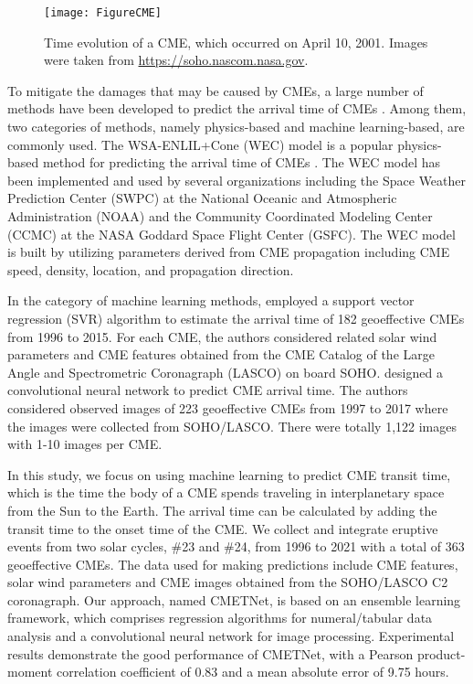 \documentclass{article}
\begin{document}
\begin{figure}
\begin{center}
\texttt{[image: FigureCME]}
\end{center}
\caption{Time evolution of a CME,
which occurred on April 10, 2001.
Images were taken from 
\url{https://soho.nascom.nasa.gov}.}
\label{fig:CME-images}
\end{figure}

To mitigate the damages that may be caused by CMEs, 
a large number of methods have been developed to
predict the arrival time of CMEs 
\citep{2014SpWea..12..448Z,2019SpWea..17.1166C,2019RSPTA.37780096V}. 
Among them, two categories of methods, namely physics-based and machine learning-based, are commonly used.
The WSA-ENLIL+Cone (WEC) model \citep{https://doi.org/10.1029/2003JA010135,2018SpWea..16.1245R}
is a popular physics-based method for predicting 
the arrival time of CMEs \citep{2018SpWea..16.1245R}. 
The WEC model has been implemented and used 
by several organizations including
the Space Weather Prediction Center (SWPC) at
the National Oceanic and Atmospheric Administration (NOAA) and 
the Community Coordinated Modeling Center (CCMC)
at the NASA Goddard Space Flight Center (GSFC).
The WEC model is built by utilizing
parameters derived from CME propagation 
including CME speed, density, location, and propagation direction.

In the category of machine learning methods,
\citet{2018ApJ...855..109L} employed a support vector regression (SVR) algorithm to 
estimate the arrival time of  
182 geoeffective CMEs from 1996 to 2015.  
For each CME, the authors considered 
related solar wind parameters and CME features 
obtained from the CME Catalog
of the Large Angle and Spectrometric Coronagraph (LASCO) on board SOHO.
\citet{2019ApJ...881...15W} designed a convolutional neural network to predict CME arrival time. 
The authors considered observed images of 223 geoeffective CMEs from 1997 to 2017
where the images were collected from SOHO/LASCO.
There were totally 1,122 images with 1-10 images per CME. 

In this study, we focus on using machine learning to predict CME transit time, 
which is the time the body of a CME spends traveling in interplanetary space 
from the Sun to the Earth. 
The arrival time can be calculated by adding the transit time to the
onset time of the CME.
We collect and integrate eruptive events from two solar cycles, \#23 and \#24,
from 1996 to 2021 with a total of 363 geoeffective CMEs.
The data used for making predictions include CME features, 
solar wind parameters and CME images obtained 
from the SOHO/LASCO C2 coronagraph.
Our approach, named CMETNet, is based on an ensemble learning framework,
which comprises 
regression algorithms 
for numeral/tabular data analysis
and a convolutional neural network for image processing. 
Experimental results demonstrate the good performance of CMETNet,
with a Pearson product-moment correlation coefficient of 0.83 and a mean absolute error of 9.75 hours. 
\end{document}
